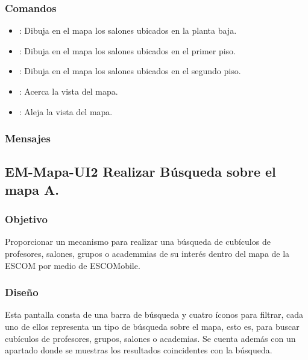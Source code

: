 \subsubsection{Comandos}
	\begin{itemize}
		\item {}: Dibuja en el mapa los salones ubicados en la planta baja.
		\item {}: Dibuja en el mapa los salones ubicados en el primer piso.
		\item {}: Dibuja en el mapa los salones ubicados en el segundo piso.
		\item \IUbutton{  +  }: Acerca la vista del mapa.
		\item \IUbutton{  -  }: Aleja la vista del mapa.
	\end{itemize}

\subsubsection{Mensajes}
	\begin{Citemize}
		\item {}
	\end{Citemize}


\subsection{EM-Mapa-UI2 Realizar Búsqueda sobre el mapa A.}

\subsubsection{Objetivo}
	\noindent
	Proporcionar un mecanismo para realizar una búsqueda de cubículos de profesores, salones, grupos 
	o academmias de su interés dentro del mapa de la ESCOM por medio de ESCOMobile.

\subsubsection{Diseño}
	\noindent
	Esta pantalla consta de una barra de búsqueda y cuatro íconos para filtrar, cada uno de ellos representa un tipo
	de búsqueda sobre el mapa, esto es, para buscar cubículos de profesores, grupos, salones o academias.
	Se cuenta además con un apartado donde se muestras los resultados coincidentes con la búsqueda.


